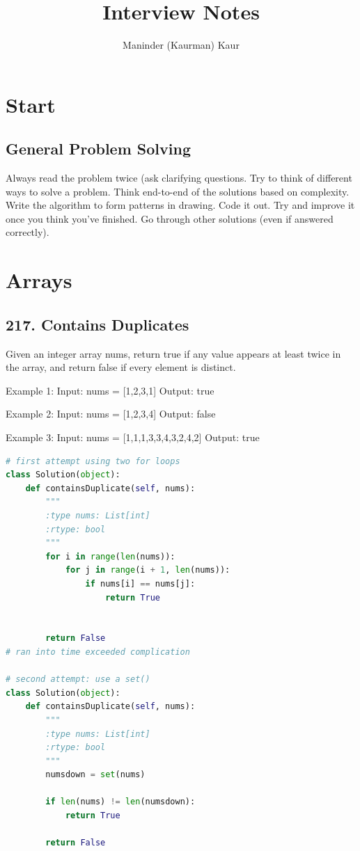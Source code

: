 \documentclass[11pt]{article}
\title{Interview Notes}
\author{Maninder (Kaurman) Kaur}
\begin{document}
\maketitle

\section*{Start}
\subsection*{General Problem Solving}
 Always read the problem twice (ask clarifying questions. Try to think of different ways to solve a problem. Think end-to-end of the solutions based on complexity. Write the algorithm to form patterns in drawing. Code it out. Try and improve it once you think you've finished. Go through other solutions (even if answered correctly).

\section*{Arrays}
\subsection*{217. Contains Duplicates}
Given an integer array nums, return true if any value appears at least twice in the array, and return false if every element is distinct.

Example 1:
Input: nums = [1,2,3,1]
Output: true

Example 2:
Input: nums = [1,2,3,4]
Output: false

Example 3:
Input: nums = [1,1,1,3,3,4,3,2,4,2]
Output: true

\begin{lstlisting}[language=python,mathescape=true]
# first attempt using two for loops
class Solution(object):
    def containsDuplicate(self, nums):
        """
        :type nums: List[int]
        :rtype: bool
        """
        for i in range(len(nums)):
            for j in range(i + 1, len(nums)):
                if nums[i] == nums[j]:
                    return True
        
        
        return False
# ran into time exceeded complication

# second attempt: use a set()
class Solution(object):
    def containsDuplicate(self, nums):
        """
        :type nums: List[int]
        :rtype: bool
        """
        numsdown = set(nums)

        if len(nums) != len(numsdown):
            return True
        
        return False
\end{lstlisting}
\end{document}
